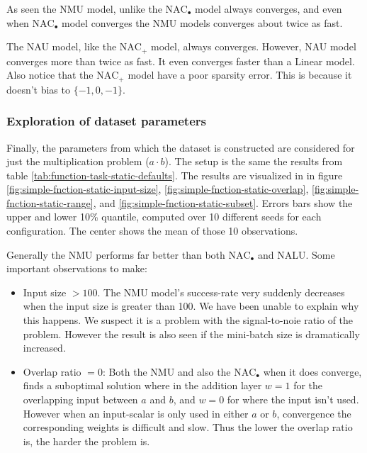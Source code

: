 As seen the NMU model, unlike the $\mathrm{NAC}_{\bullet}$ model always converges, and even when $\mathrm{NAC}_{\bullet}$ model converges the NMU models converges about twice as fast.

The NAU model, like the $\mathrm{NAC}_{+}$ model, always converges. However, NAU model converges more than twice as fast. It even converges faster than a Linear model. Also notice that the $\mathrm{NAC}_{+}$ model have a poor sparsity error. This is because it doesn't bias to $\{-1, 0, -1\}$.


\subsubsection{Exploration of dataset parameters}

Finally, the parameters from which the dataset is constructed are considered for just the multiplication problem ($a \cdot b$). The setup is the same the results from table \ref{tab:function-task-static-defaults}. The results are visualized in in figure \ref{fig:simple-fnction-static-input-size}, \ref{fig:simple-fnction-static-overlap}, \ref{fig:simple-fnction-static-range}, and \ref{fig:simple-fnction-static-subset}. Errors bars show the upper and lower 10\% quantile, computed over 10 different seeds for each configuration. The center shows the mean of those 10 observations.

Generally the NMU performs far better than both $\mathrm{NAC}_{\bullet}$ and NALU. Some important observations to make:

\begin{itemize}
\item Input size $> 100$. The NMU model's success-rate very suddenly decreases when the input size is greater than 100. We have been unable to explain why this happens. We suspect it is a problem with the signal-to-noie ratio of the problem. However the result is also seen if the mini-batch size is dramatically increased.
\item Overlap ratio $= 0$: Both the NMU and also the $\mathrm{NAC}_{\bullet}$ when it does converge, finds a suboptimal solution where in the addition layer $w=1$ for the overlapping input between $a$ and $b$, and $w = 0$ for where the input isn't used. However when an input-scalar is only used in either $a$ or $b$, convergence the corresponding weights is difficult and slow. Thus the lower the overlap ratio is, the harder the problem is.
\end{itemize}

